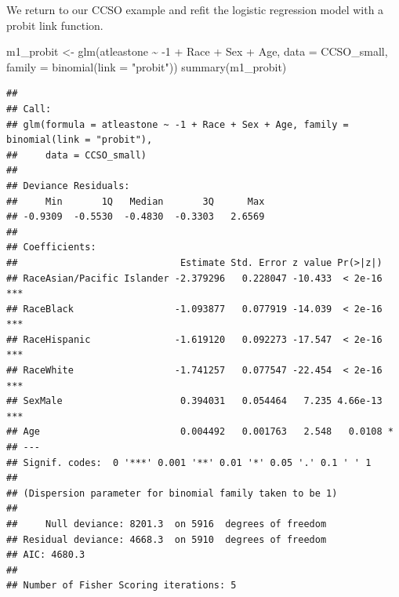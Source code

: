 \documentclass[
  ignorenonframetext,
]{beamer}
\newenvironment{Shaded}{\begin{snugshade}}{\end{snugshade}}
\newcommand{\AttributeTok}[1]{\textcolor[rgb]{0.77,0.63,0.00}{#1}}
\newcommand{\DecValTok}[1]{\textcolor[rgb]{0.00,0.00,0.81}{#1}}
\newcommand{\FunctionTok}[1]{\textcolor[rgb]{0.00,0.00,0.00}{#1}}
\newcommand{\NormalTok}[1]{#1}
\newcommand{\OtherTok}[1]{\textcolor[rgb]{0.56,0.35,0.01}{#1}}
\newcommand{\SpecialCharTok}[1]{\textcolor[rgb]{0.00,0.00,0.00}{#1}}
\newcommand{\StringTok}[1]{\textcolor[rgb]{0.31,0.60,0.02}{#1}}
\begin{document}
\begin{frame}[fragile]{}
\protect\hypertarget{section-11}{}
\vspace{12pt}

We return to our CCSO example and refit the logistic regression model
with a probit link function.

\tiny

\begin{Shaded}
\begin{Highlighting}[]
\NormalTok{m1\_probit }\OtherTok{\textless{}{-}} \FunctionTok{glm}\NormalTok{(atleastone }\SpecialCharTok{\textasciitilde{}} \SpecialCharTok{{-}}\DecValTok{1} \SpecialCharTok{+}\NormalTok{ Race }\SpecialCharTok{+}\NormalTok{ Sex }\SpecialCharTok{+}\NormalTok{ Age, }\AttributeTok{data =}\NormalTok{ CCSO\_small, }
          \AttributeTok{family =} \FunctionTok{binomial}\NormalTok{(}\AttributeTok{link =} \StringTok{"probit"}\NormalTok{))}
\FunctionTok{summary}\NormalTok{(m1\_probit)}
\end{Highlighting}
\end{Shaded}

\begin{verbatim}
## 
## Call:
## glm(formula = atleastone ~ -1 + Race + Sex + Age, family = binomial(link = "probit"), 
##     data = CCSO_small)
## 
## Deviance Residuals: 
##     Min       1Q   Median       3Q      Max  
## -0.9309  -0.5530  -0.4830  -0.3303   2.6569  
## 
## Coefficients:
##                             Estimate Std. Error z value Pr(>|z|)    
## RaceAsian/Pacific Islander -2.379296   0.228047 -10.433  < 2e-16 ***
## RaceBlack                  -1.093877   0.077919 -14.039  < 2e-16 ***
## RaceHispanic               -1.619120   0.092273 -17.547  < 2e-16 ***
## RaceWhite                  -1.741257   0.077547 -22.454  < 2e-16 ***
## SexMale                     0.394031   0.054464   7.235 4.66e-13 ***
## Age                         0.004492   0.001763   2.548   0.0108 *  
## ---
## Signif. codes:  0 '***' 0.001 '**' 0.01 '*' 0.05 '.' 0.1 ' ' 1
## 
## (Dispersion parameter for binomial family taken to be 1)
## 
##     Null deviance: 8201.3  on 5916  degrees of freedom
## Residual deviance: 4668.3  on 5910  degrees of freedom
## AIC: 4680.3
## 
## Number of Fisher Scoring iterations: 5
\end{verbatim}
\end{frame}
\end{document}
